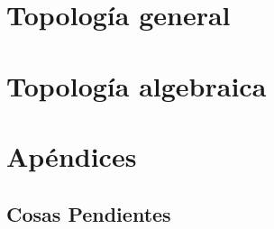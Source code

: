 \documentclass[a4paper, 10pt, oneside, titlepage, openany, onecolumn, final]{book}
\title{\tb{Topología Elemental}}
\author{Álvaro García Tenorio \and Manuel Navarro García\and Iván Prada Cazalla \and Álvaro Rodríguez García \and Clara Rodríguez Núñez}
\date{\today}
\begin{document}
	\maketitle
	\tableofcontents
		
	
	
	\part{Topología general}	
	
	
	
	
	 
	
	
	
	\part{Topología algebraica}
	
	
	\appendix
	\part{Apéndices}
	
	
	
	\chapter{Cosas Pendientes}
	
	
	
	
	
	
	
	
	\printindex[general]
	\printindex[topologias]
\end{document}
